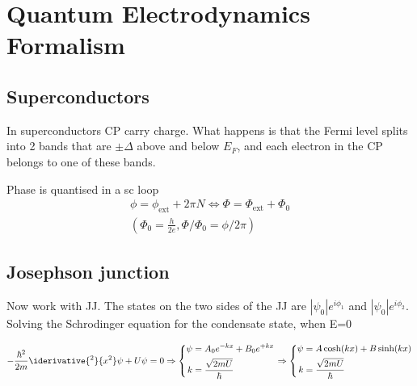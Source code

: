 
\section{Quantum Electrodynamics Formalism\label{subsec:l2-CPB}}

   \subsection{Superconductors}
   In  superconductors CP  carry charge.   What happens  is that  the
   Fermi level  splits into  2 bands that  are $\pm\Delta$  above and
   below $E_F$, and  each electron in the CP belongs  to one of these
   bands.


   {{ Phase is quantised in a sc loop
       \begin{equation}
         \begin{aligned}
           \phi  = \phi_\text{ext}  + 2\pi  N  \Leftrightarrow \Phi  = \Phi_\text{ext}  +
           \Phi_0 \\(\Phi_0 = \frac{h}{2e}, \Phi/\Phi_0=\phi/2\pi)
         \end{aligned}
       \end{equation}
     }}

   \subsection{Josephson junction}
   Now work  with JJ.   The states  on the  two sides  of the  JJ are
   $\left|\psi_0\right|e^{i\phi_1}$                               and
   $\left|\psi_0\right|e^{i\phi_2}$.     Solving   the    Schrodinger
   equation for the condensate state, when E=0

   \begin{equation}
     -\frac{\hbar^2}{2m}\iderivative{^2}{x^2}\psi+U\psi = 0 \Rightarrow
     \left\lbrace\begin{aligned}
         \psi & = A_0e^{-kx}+B_0e^{+kx}\\
         k & = \frac{\sqrt{2mU}}{\hbar}
       \end{aligned} \right. \Rightarrow \left\lbrace\begin{aligned}
         \psi & = A\cosh(kx)+B\sinh(kx)\\
         k & = \frac{\sqrt{2mU}}{\hbar}
       \end{aligned} \right.
   \end{equation}

